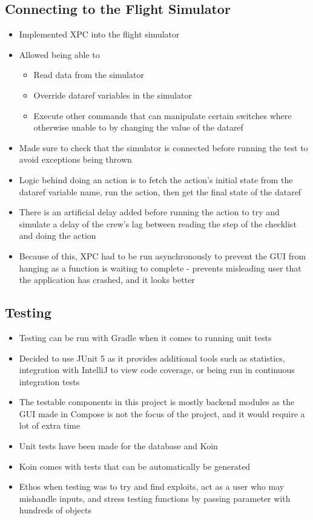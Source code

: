 \documentclass[../dissertation.tex]{subfiles}
\begin{document}
\subsection{Connecting to the Flight Simulator}
\begin{itemize}
  \item Implemented XPC into the flight simulator
  \item Allowed being able to
  \begin{itemize}
    \item Read data from the simulator
    \item Override dataref variables in the simulator
    \item Execute other commands that can manipulate certain switches
      where otherwise unable to by changing the value of the dataref
  \end{itemize}
  \item Made sure to check that the simulator is connected before running
    the test to avoid exceptions being thrown
  \item Logic behind doing an action is to fetch the action's initial state
    from the dataref variable name, run the action, then get the final state
    of the dataref
  \item There is an artificial delay added before running the action to
    try and simulate a delay of the crew's lag between reading the step of the
    checklist and doing the action
  \item Because of this, XPC had to be run asynchronously to prevent the
    GUI from hanging as a function is waiting to complete - prevents misleading
    user that the application has crashed, and it looks better 
\end{itemize}


\subsection{Testing}
\begin{itemize}
  \item Testing can be run with Gradle when it comes to running unit tests
  \item Decided to use JUnit 5 as it provides additional tools such as
    statistics, integration with IntelliJ to view code coverage,
    or being run in continuous integration tests
  \item The testable components in this project is mostly backend modules as
    the GUI made in Compose is not the focus of the project, and it would
    require a lot of extra time
  \item Unit tests have been made for the database and Koin
  \item Koin comes with tests that can be automatically be generated
  \item Ethos when testing was to try and find exploits, act as a
    user who may mishandle inputs, and stress testing functions
    by passing parameter with hundreds of objects
\end{itemize}
\end{document}
